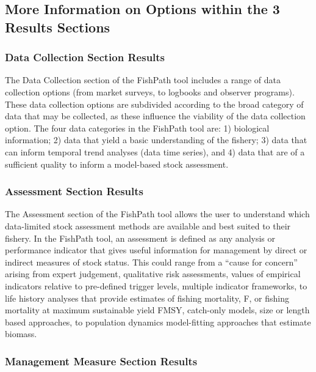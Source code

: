 \documentclass[
  11pt,
]{book}
\begin{document}
\hypertarget{more-information-on-options-within-the-3-results-sections}{%
\subsection{More Information on Options within the 3 Results Sections}\label{more-information-on-options-within-the-3-results-sections}}

\hypertarget{data-collection-section-results}{%
\subsubsection{Data Collection Section Results}\label{data-collection-section-results}}

The Data Collection section of the FishPath tool includes a range of data collection options (from market surveys, to logbooks and observer programs). These data collection options are subdivided according to the broad category of data that may be collected, as these influence the viability of the data collection option. The four data categories in the FishPath tool are: 1) biological information; 2) data that yield a basic understanding of the fishery; 3) data that can inform temporal trend analyses (data time series), and 4) data that are of a sufficient quality to inform a model-based stock assessment.

\hypertarget{assessment-section-results}{%
\subsubsection{Assessment Section Results}\label{assessment-section-results}}

The Assessment section of the FishPath tool allows the user to understand which data-limited stock assessment methods are available and best suited to their fishery. In the FishPath tool, an assessment is defined as any analysis or performance indicator that gives useful information for management by direct or indirect measures of stock status. This could range from a ``cause for concern'' arising from expert judgement, qualitative risk assessments, values of empirical indicators relative to pre-defined trigger levels, multiple indicator frameworks, to life history analyses that provide estimates of fishing mortality, F, or fishing mortality at maximum sustainable yield FMSY, catch-only models, size or length based approaches, to population dynamics model-fitting approaches that estimate biomass.

\hypertarget{management-measure-section-results}{%
\subsubsection{Management Measure Section Results}\label{management-measure-section-results}}
\end{document}
